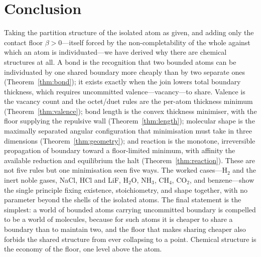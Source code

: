\documentclass[11pt,a4paper]{article}
\theoremstyle{thmstyle}
\theoremstyle{definition}
\theoremstyle{remark}
\newcommand{\floorc}{\beta}
\begin{document}
\section{Conclusion}
\label{sec:conclusion}

Taking the partition structure of the isolated atom as given, and adding
only the contact floor $\floorc>0$---itself forced by the
non-completability of the whole against which an atom is individuated---we
have derived why there are chemical structures at all. A bond is the
recognition that two bounded atoms can be individuated by one shared
boundary more cheaply than by two separate ones (Theorem~\ref{thm:bond});
it exists exactly when the join lowers total boundary thickness, which
requires uncommitted valence---vacancy---to share. Valence is the vacancy
count and the octet/duet rules are the per-atom thickness minimum
(Theorem~\ref{thm:valence}); bond length is the convex thickness
minimiser, with the floor supplying the repulsive wall
(Theorem~\ref{thm:length}); molecular shape is the maximally separated
angular configuration that minimisation must take in three dimensions
(Theorem~\ref{thm:geometry}); and reaction is the monotone, irreversible
propagation of boundary toward a floor-limited minimum, with affinity the
available reduction and equilibrium the halt (Theorem~\ref{thm:reaction}).
These are not five rules but one minimisation seen five ways. The worked
cases---H$_2$ and the inert noble gases, NaCl, HCl and LiF, H$_2$O, NH$_3$,
CH$_4$, CO$_2$, and benzene---show the single principle fixing existence,
stoichiometry, and shape together, with no parameter beyond the shells of
the isolated atoms. The final statement is the simplest: a world of
bounded atoms carrying uncommitted boundary is compelled to be a world of
molecules, because for such atoms it is cheaper to share a boundary than
to maintain two, and the floor that makes sharing cheaper also forbids the
shared structure from ever collapsing to a point. Chemical structure is
the economy of the floor, one level above the atom.



\end{document}
